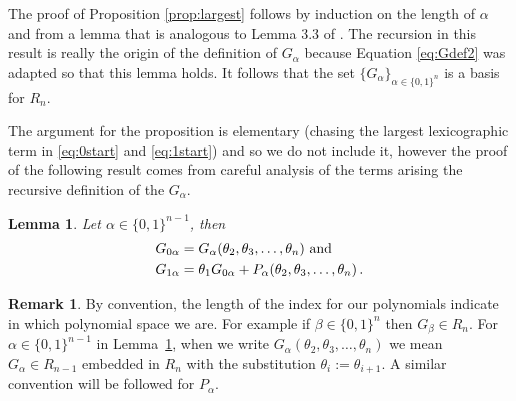 \documentclass[11pt]{amsart}
\newtheorem{lemma}[theorem]{Lemma}
\theoremstyle{definition}
\newtheorem{remark}[theorem]{Remark}
\numberwithin{equation}{section}
\begin{document}
The proof of Proposition \ref{prop:largest} follows by induction
on the length of $\alpha$ and
from a lemma that is analogous to Lemma 3.3 of \cite{AB}.
The recursion in this result is really the origin of the definition
of $G_\alpha$ because Equation \eqref{eq:Gdef2}
was adapted so that this lemma holds.  It follows that
the set $\{ G_\alpha \}_{\alpha \in \{0,1\}^n}$ is a basis
for $R_n$.

The argument for the proposition is elementary (chasing the largest lexicographic
term in \eqref{eq:0start} and \eqref{eq:1start})
and so we do not include it, however the proof of the
following result comes from careful analysis of the
terms arising the recursive definition of the $G_\alpha$.

\begin{lemma}\label{lem:LT}
 Let $\alpha \in \{0,1\}^{n-1}$, then
\begin{align}
G_{0\alpha} &= G_\alpha(\theta_2, \theta_3, \ldots, \theta_n) \hbox{ and }\label{eq:0start}\\
G_{1\alpha} &= \theta_1 G_{0\alpha} + P_{\alpha}(\theta_2, \theta_3, \ldots, \theta_n)\,. \label{eq:1start}
\end{align}
\end{lemma}

\begin{remark}\label{rem:shift}
By convention, the length of the index for our polynomials indicate in which polynomial space we are.
For example if $\beta   \in \{0,1\}^{n}$ then $G_\beta\in R_n$. For $\alpha \in \{0,1\}^{n-1}$  in Lemma~\ref{lem:LT}, when we write
$G_\alpha(\theta_2, \theta_3, \ldots, \theta_n)$ we mean $G_\alpha\in  R_{n-1}$
embedded in $R_n$ with the substitution
$\theta_i:=\theta_{i+1}$. A similar convention will be followed for $P_\alpha$.
\end{remark}
\end{document}
